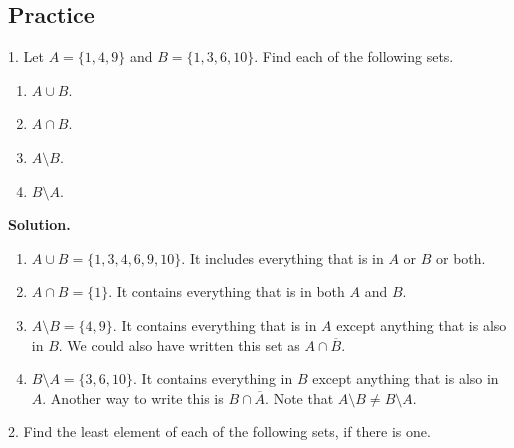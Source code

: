 \documentclass[10pt,]{book}
\theoremstyle{plain}
\theoremstyle{definition}
\theoremstyle{definition}
\numberwithin{equation}{chapter}
\renewcommand{\bar}{\overline}
\begin{document}
\subsection[{Practice}]{Practice}\label{practice_intro-sets}
\begin{exerciselist}
\item[1.]\hypertarget{exercise-21}{}\noindent%
\hypertarget{p-449}{}%
Let \(A = \{1, 4, 9\}\) and \(B = \{1, 3, 6, 10\}\).  Find each of the following sets.%
\hypertarget{p-450}{}%
\leavevmode%
\begin{enumerate}[label=(\alph*)]
\item\hypertarget{li-308}{}\hypertarget{p-451}{}%
\(A \cup B\).   \framebox[15em]{\raisebox{1ex}{}}%
\item\hypertarget{li-309}{}\hypertarget{p-452}{}%
\(A \cap B\).  \framebox[15em]{\raisebox{1ex}{}}%
\item\hypertarget{li-310}{}\hypertarget{p-453}{}%
\(A \setminus B\).  \framebox[15em]{\raisebox{1ex}{}}%
\item\hypertarget{li-311}{}\hypertarget{p-454}{}%
\(B \setminus A\).  \framebox[15em]{\raisebox{1ex}{}}%
\end{enumerate}
%
\par
\medskip\noindent%
\textbf{Solution.}\quad \hypertarget{p-455}{}%
\leavevmode%
\begin{enumerate}[label=(\alph*)]
\item\hypertarget{li-312}{}\hypertarget{p-456}{}%
\(A \cup B = \{1,3,4,6,9,10\}\).  It includes everything that is in \(A\) or \(B\) or both.%
\item\hypertarget{li-313}{}\hypertarget{p-457}{}%
\(A \cap B = \{1\}\).  It contains everything that is in both \(A\) and \(B\).%
\item\hypertarget{li-314}{}\hypertarget{p-458}{}%
\(A \setminus B = \{4, 9\}\).  It contains everything that is in \(A\) except anything that is also in \(B\).  We could also have written this set as \(A \cap \bar{B}\).%
\item\hypertarget{li-315}{}\hypertarget{p-459}{}%
\(B \setminus A = \{3, 6, 10\}\). It contains everything in \(B\) except anything that is also in \(A\).  Another way to write this is \(B \cap \bar{A}\).  Note that \(A \setminus B \ne B \setminus A\).%
\end{enumerate}
%
\par
\item[2.]\hypertarget{exercise-22}{}\noindent%
\hypertarget{p-460}{}%
Find the least element of each of the following sets, if there is one.%

\end{exerciselist}
\end{document}
